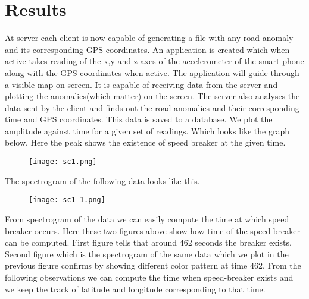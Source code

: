 \documentclass[12pt,twocolumn]{article}
\begin{document}
\section{Results}
At server each client is now capable of generating a file with any road anomaly and its corresponding GPS coordinates.
An application is created which when active takes reading of the x,y and z axes of the accelerometer of the smart-phone along with the GPS coordinates when active.
The application will guide through a visible map on screen. It is capable of receiving data from the server and plotting the anomalies(which matter) on the screen.
The server also analyses the data sent by the client and finds out the road anomalies and their corresponding time and GPS coordinates. This data is saved to a database.
We plot the amplitude against time for a given set of readings. Which looks like the graph below. Here the peak shows the existence of speed breaker at the given time.
\begin{figure}[ht!]
\centering
\texttt{[image: sc1.png]}
\end{figure} 
\newpage
The spectrogram of the following data looks like this.
\begin{figure}[ht!]
\centering
\texttt{[image: sc1-1.png]}
\end{figure} 
\newpage
From spectrogram of the data we can easily compute the time at which speed breaker occurs. Here these two figures above show how time of the speed breaker can be computed. First figure tells that around 462 seconds the breaker exists. Second figure which is the spectrogram of the same data which we plot in the previous figure confirms by showing different color pattern at time 462.
From the following observations we can compute the time when speed-breaker exists and we keep the track of latitude and longitude corresponding to that time.\\
\end{document}
